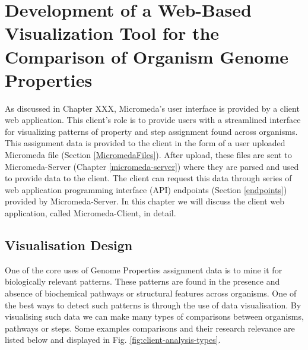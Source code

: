 \chapter{Development of a Web-Based Visualization Tool for the Comparison of Organism Genome Properties} \label{micromeda-client}

As discussed in Chapter XXX, Micromeda's user interface is provided by a client web application. This client's role is to provide users with a streamlined interface for visualizing patterns of property and step assignment found across organisms. This assignment data is provided to the client in the form of a user uploaded Micromeda file (Section \ref{MicromedaFiles}). After upload, these files are sent to Micromeda-Server (Chapter \ref{micromeda-server}) where they are parsed and used to provide data to the client. The client can request this data through series of web application programming interface (API) endpoints (Section \ref{endpoints}) provided by Micromeda-Server. In this chapter we will discuss the client web application, called Micromeda-Client, in detail.

\section{Visualisation Design}

One of the core uses of Genome Properties assignment data is to mine it for biologically relevant patterns. These patterns are found in the presence and absence of biochemical pathways or structural features across organisms. One of the best ways to detect such patterns is through the use of data visualisation. By visualising such data we can make many types of comparisons between organisms, pathways or steps. Some examples comparisons and their research relevance are listed below and displayed in Fig. \ref{fig:client-analysis-types}. 

